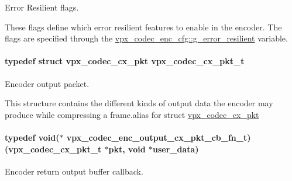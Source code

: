 Error Resilient flags. 

These flags define which error resilient features to enable in the encoder. The flags are specified through the \hyperlink{structvpx__codec__enc__cfg_a4e17173b66ca0d7dfba9978625d7ba76}{vpx\+\_\+codec\+\_\+enc\+\_\+cfg\+::g\+\_\+error\+\_\+resilient} variable. 
\paragraph[{\texorpdfstring{vpx\+\_\+codec\+\_\+cx\+\_\+pkt\+\_\+t}{vpx_codec_cx_pkt_t}}]{\setlength{\rightskip}{0pt plus 5cm}typedef struct {\bf vpx\+\_\+codec\+\_\+cx\+\_\+pkt}  {\bf vpx\+\_\+codec\+\_\+cx\+\_\+pkt\+\_\+t}}\hypertarget{group__encoder_ga3f711e17fbefac545e8959ef5a023556}{}\label{group__encoder_ga3f711e17fbefac545e8959ef5a023556}


Encoder output packet. 

This structure contains the different kinds of output data the encoder may produce while compressing a frame.\+alias for struct \hyperlink{structvpx__codec__cx__pkt}{vpx\+\_\+codec\+\_\+cx\+\_\+pkt} 
\paragraph[{\texorpdfstring{vpx\+\_\+codec\+\_\+enc\+\_\+output\+\_\+cx\+\_\+pkt\+\_\+cb\+\_\+fn\+\_\+t}{vpx_codec_enc_output_cx_pkt_cb_fn_t}}]{\setlength{\rightskip}{0pt plus 5cm}typedef void($\ast$  vpx\+\_\+codec\+\_\+enc\+\_\+output\+\_\+cx\+\_\+pkt\+\_\+cb\+\_\+fn\+\_\+t) ({\bf vpx\+\_\+codec\+\_\+cx\+\_\+pkt\+\_\+t} $\ast$pkt, void $\ast$user\+\_\+data)}\hypertarget{group__encoder_gaab1213b7c5f36eb382f736ab919767e6}{}\label{group__encoder_gaab1213b7c5f36eb382f736ab919767e6}


Encoder return output buffer callback. 

